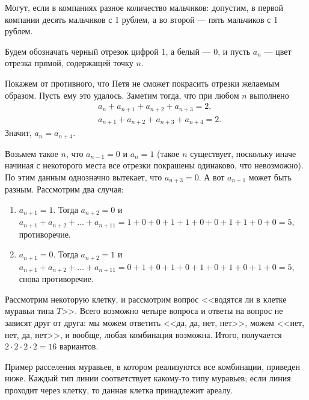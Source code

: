 ﻿
\begin{itemize}
\itA Могут, если в компаниях разное количество мальчиков: допустим, в первой компании десять мальчиков с 1 рублем, а во второй --- пять мальчиков с 1 рублем.

\itB 

Будем обозначать черный отрезок цифрой 1, а белый --- 0, и пусть $a_n$ --- цвет отрезка прямой, содержащей
точку $n$.

Покажем от противного, что Петя не сможет покрасить отрезки желаемым образом.
Пусть ему это удалось.
Заметим тогда, что при любом $n$ выполнено
\begin{align*}
	& a_n+a_{n+1}+a_{n+2}+a_{n+3} = 2, \\
	& a_{n+1}+a_{n+2}+a_{n+3}+a_{n+4} = 2.
\end{align*}
Значит, $a_n = a_{n+4}$. 

Возьмем такое $n$, что $a_{n-1} = 0$ и $a_n = 1$ (такое $n$ существует, поскольку иначе
начиная с некоторого места все отрезки покрашены одинаково, что невозможно). 
По этим данным однозначно вытекает, что $a_{n+3} = 0$. А вот $a_{n+1}$ может быть
разным.
Рассмотрим два случая: 

\begin{enumerate}
\item $a_{n+1} = 1$. Тогда $a_{n+2} = 0$ и
$a_{n+1} + a_{n+2} + \dots + a_{n+11} = 1 + 0 + 0 + 1 + 1 + 0 + 0 + 1 + 1 + 0 + 0 = 5$,
противоречие.

\item $a_{n+1} = 0$. Тогда $a_{n+2} = 1$ и
$a_{n+1} + a_{n+2} + \dots + a_{n+11} = 0 + 1 + 0 + 1 + 0 + 1 + 0 + 1 + 0 + 1 + 0 = 5$,
снова противоречие.
\end{enumerate}

\itC Рассмотрим некоторую клетку, и рассмотрим вопрос <<водятся ли в клетке муравьи типа $T$>>.
Всего возможно четыре вопроса и ответы на вопрос не зависят друг от друга:
мы можем ответить <<да, да, нет, нет>>, можем <<нет, нет, да, нет>>, и вообще, 
любая комбинация возможна. 
Итого, получается $2 \cdot 2 \cdot 2 \cdot 2 = 16$ вариантов. 

Пример расселения муравьев, в котором реализуются все комбинации, приведен ниже.
Каждый тип линии соответствует какому-то типу муравьев;  если линия проходит
через клетку, то данная клетка принадлежит ареалу.

\begin{center}
\end{center}
\end{itemize}
